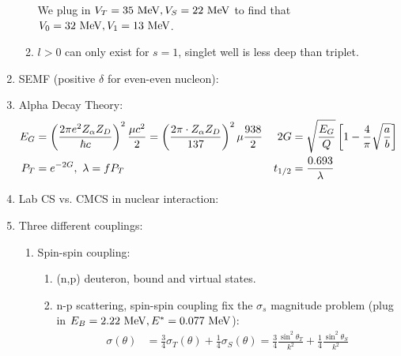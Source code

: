 \documentclass{school-22.101-notes}
\begin{document}
\begin{enumerate}
\begin{enumerate}
    We plug in $V_T = 35 \mbox{ } \mathrm{MeV}, V_S = 22 \mbox{ } \mathrm{MeV}$ to find that $V_0 = 32 \mbox{ } \mathrm{MeV}, V_1 = 13 \mbox{ } \mathrm{MeV}$. 
    \item $l>0$ can only exist for $s=1$, singlet well is less deep than triplet.     
    \end{enumerate}
\item SEMF (positive $\delta$ for even-even nucleon): 
\item Alpha Decay Theory:
    \begin{align}
    E_G &= \left(\frac{2 \pi e^2 Z_{\alpha} Z_D}{\hbar c}\right)^2 \frac{\mu c^2}{2} = \left( \frac{2 \pi \cdot Z_{\alpha} Z_D}{137} \right)^2 \mu \frac{938}{2} &
    2G &= \sqrt{\frac{E_G}{Q}} \left[ 1 - \frac{4}{\pi} \sqrt{\frac{a}{b}} \right] \\
    P_T &= e^{-2G}, \mbox{ } \lambda = f P_T & t_{1/2} &= \frac{0.693}{\lambda} 
    \end{align}
\item Lab CS vs. CMCS in nuclear interaction:   
\item Three different couplings:
    \begin{enumerate}
    \item Spin-spin coupling: 
        \begin{enumerate}
        \item (n,p) deuteron, bound and virtual states.
        \item n-p scattering, spin-spin coupling fix the $\sigma_s$ magnitude problem (plug in $E_B = 2.22 \mbox{ } \mathrm{MeV}, E^*  = 0.077 \mbox{ } \mathrm{MeV}$):
        \begin{align}
        \sigma(\theta) &= \frac{3}{4} \sigma_T (\theta) + \frac{1}{4} \sigma_S (\theta) = \frac{3}{4} \frac{\sin^2 \theta_T}{k^2} + \frac{1}{4} \frac{\sin^2 \theta_S}{k^2} \\

\end{align}
\end{enumerate}
\end{enumerate}
\end{enumerate}
\end{document}
